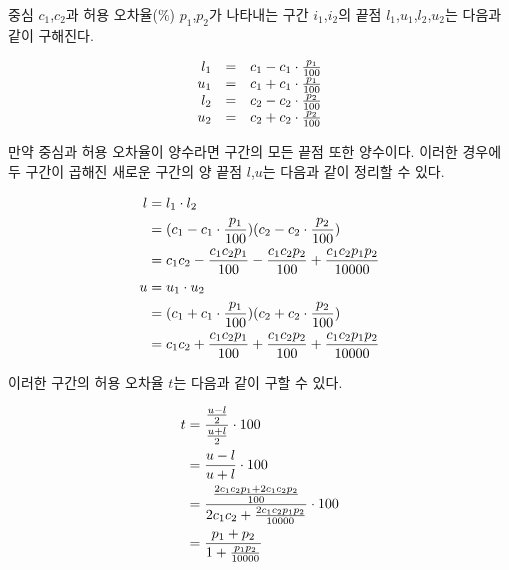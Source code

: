 중심 $c_1$,$c_2$과 허용 오차율($\%$) $p_1$,$p_2$가 나타내는 구간 $i_1$,$i_2$의
끝점 $l_1$,$u_1$,$l_2$,$u_2$는 다음과 같이 구해진다.

\begin{equation}\notag
  \begin{array}{rcl}
    l_1 & = & c_1 - c_1 \cdot \frac{p_1}{100} \\
    u_1 & = & c_1 + c_1 \cdot \frac{p_1}{100} \\
    l_2 & = & c_2 - c_2 \cdot \frac{p_2}{100} \\
    u_2 & = & c_2 + c_2 \cdot \frac{p_2}{100} \\
  \end{array}
\end{equation}

만약 중심과 허용 오차율이 양수라면 구간의 모든 끝점 또한 양수이다. 이러한
경우에 두 구간이 곱해진 새로운 구간의 양 끝점 $l$,$u$는 다음과 같이 정리할 수
있다.

\begin{equation}\notag
  \begin{aligned}
    l & = l_1 \cdot l_2 \\
      & = (c_1 - c_1 \cdot \frac{p_1}{100}) (c_2 - c_2 \cdot \frac{p_2}{100}) \\
      & = c_1c_2 - \frac{c_1c_2p_1}{100} - \frac{c_1c_2p_2}{100} + \frac{c_1c_2p_1p_2}{10000} \\
    u & = u_1 \cdot u_2 \\
      & = (c_1 + c_1 \cdot \frac{p_1}{100}) (c_2 + c_2 \cdot \frac{p_2}{100}) \\
      & = c_1c_2 + \frac{c_1c_2p_1}{100} + \frac{c_1c_2p_2}{100} + \frac{c_1c_2p_1p_2}{10000} \\
  \end{aligned}
\end{equation}

이러한 구간의 허용 오차율 $t$는 다음과 같이 구할 수 있다.

\begin{equation}\notag
  \begin{aligned}
    t & = \frac{\frac{u - l}{2}}{\frac{u + l}{2}} \cdot 100 \\
      & = \frac{u-l}{u+l} \cdot 100 \\
      & = \frac{\frac{2c_1c_2p_1+2c_1c_2p_2}{100}}{2c_1c_2 +
        \frac{2c_1c_2p_1p_2}{10000}} \cdot 100 \\
      & = \frac{p_1+p_2}{1 + \frac{p_1p_2}{10000}} \\
  \end{aligned}
\end{equation}

